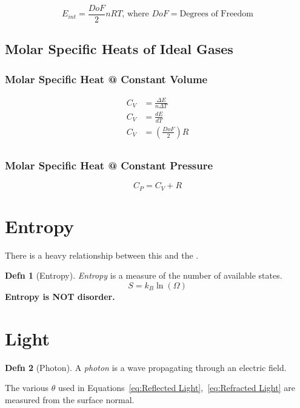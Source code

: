 \documentclass[10pt,letterpaper,final,twoside,notitlepage]{article}
\numberwithin{equation}{section} %
\theoremstyle{definition}
\newtheorem{definition}{Defn}
\theoremstyle{remark}
\begin{document}
		\begin{equation} \label{eq:Internal Energy of Ideal Gas}
			E_{int} = \frac{DoF}{2} nRT \text{, where } DoF=\text{Degrees of Freedom}
		\end{equation}
		
	\subsection*{Molar Specific Heats of Ideal Gases} \label{subsec:Molar Specific Heats of Ideal Gases}
		\subsubsection*{Molar Specific Heat @ Constant Volume} \label{subsubsec:Molar Specific Heat @ Constant Volume}
			\begin{equation} \label{eq:Molar Specific Heat @ Constant Volume}
				\begin{aligned}
					C_{V} &= \frac{\Delta E}{n \Delta T} \\
					C_{V} &= \frac{dE}{dT} \\
					C_{V} &= \left( \frac{DoF}{2} \right) R \\
				\end{aligned}
			\end{equation}
		\subsubsection*{Molar Specific Heat @ Constant Pressure} \label{Molar Specific Heat @ Constant Pressure}
			\begin{equation} \label{eq:Molar Specific Heat @ Constant Pressure}
				C_{P} = C_{V} + R
			\end{equation}
		
		
\section{Entropy} \label{sec:Entropy}
There is a heavy relationship between this and the .
	\begin{definition}[Entropy] \label{def:Entropy}
		\emph{Entropy} is a measure of the number of available states.
		\begin{equation} \label{eq:Entropy}
			S = k_{B} \ln \left( \Omega \right)
		\end{equation}
		\textbf{Entropy is NOT disorder.}
	\end{definition}

\section{Light} \label{sec:Light}
	\begin{definition}[Photon]
		A \emph{photon} is a wave propagating through an electric field.
	\end{definition}
The various $\theta$ used in Equations~\eqref{eq:Reflected Light},~\eqref{eq:Refracted Light} are measured from the surface normal.
\end{document}
